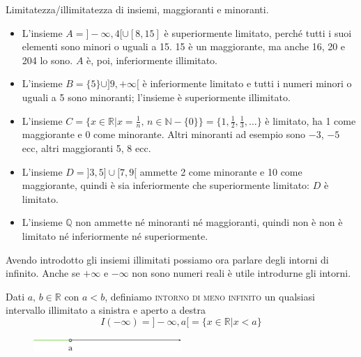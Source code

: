 \begin{esempio} Limitatezza/illimitatezza di insiemi, maggioranti e minoranti.
\begin{itemize}
  \item[a)] L'insieme $A=]-\infty,4[ \cup [8,15]$ è superiormente 
limitato, perché tutti i suoi elementi sono minori o uguali a 15. 15 è un 
maggiorante, ma anche 16, 20 e 204 lo sono. $A$ è, poi, inferiormente 
illimitato.\\
  \item[b)] L'insieme $B=\{5\}\cup]9,+\infty[$ è inferiormente limitato 
e tutti i numeri minori o uguali a 5 sono minoranti; l'insieme è 
superiormente illimitato.\\

  \item[c)] L'insieme $C=\{x\in\mathbb{R}\vert 
x=\frac{1}{n},\,n\in\mathbb{N}-\{0\}\}=\{1,\frac{1}{2},\frac{1}{3}
,\dots\}$ è limitato, ha 1 come maggiorante e 0 come minorante. Altri 
minoranti ad esempio sono $-3$, $-5$ ecc, altri maggioranti 5, 8 ecc.\\

  \item[d)] L'insieme $D=]3,5]\cup[7,9[$ ammette 2 come minorante e 10 
come maggiorante, quindi è sia inferiormente che superiormente limitato: $D$ 
è limitato.\\

  \item[e)] L'insieme $\mathbb{Q}$ non ammette né minoranti né 
maggioranti, quindi non è non è limitato né inferiormente né superiormente.\\
\end{itemize}
\end{esempio}

Avendo introdotto gli insiemi illimitati possiamo ora parlare degli intorni 
di infinito. Anche se $+\infty$ e $-\infty$ non sono numeri reali è utile 
introdurne gli intorni.\\

\begin{definizione}
  Dati $a,\,b\in\mathbb{R}$ con $a<b$, definiamo \textsc{intorno di 
meno infinito} un qualsiasi intervallo illimitato a sinistra e aperto a destra
\begin{equation}
  I(-\infty)=]-\infty,a[=\{x\in\mathbb{R}\vert x<a\}
\end{equation}
\end{definizione}

\begin{figure}[htpb!]
  \centering
  \includegraphics[width=0.5\textwidth]{img/top_4.png}%
\end{figure}


